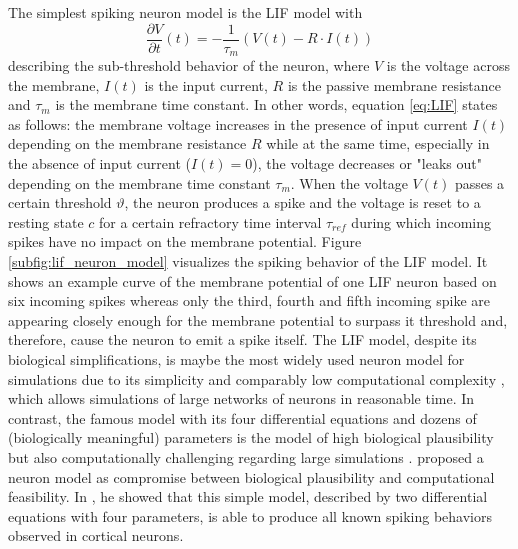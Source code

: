 The simplest spiking neuron model is the \acf{LIF} model with
\begin{equation}
\frac{\partial V}{\partial t}(t) = - \frac{1}{\tau_{m}} \left( V\left(t\right) - R \cdot I\left(t\right) \right)
\label{eq:LIF}
\end{equation}
describing the sub-threshold behavior of the neuron, where $V$ is the voltage across the membrane, $I(t)$ is the input current, $R$ is the passive membrane resistance and $\tau_{m}$ is the membrane time constant.
In other words, equation \ref{eq:LIF} states as follows: the membrane voltage increases in the presence of input current $I(t)$ depending on the membrane resistance $R$ while at the same time, especially in the absence of input current ($I(t)=0$), the voltage decreases or "leaks out" depending on the membrane time constant $\tau_{m}$.
When the voltage $V(t)$ passes a certain threshold $\vartheta$, the neuron produces a spike and the voltage is reset to a resting state $c$ for a certain refractory time interval $\tau_{ref}$ during which incoming spikes have no impact on the membrane potential.
Figure \ref{subfig:lif_neuron_model} visualizes the spiking behavior of the \ac{LIF} model.
It shows an example curve of the membrane potential of one \ac{LIF} neuron based on six incoming spikes whereas only the third, fourth and fifth incoming spike are appearing closely enough for the membrane potential to surpass it threshold and, therefore, cause the neuron to emit a spike itself.
The \ac{LIF} model, despite its biological simplifications, is maybe the most widely used neuron model for simulations due to its simplicity and comparably low computational complexity \parencite{Izhikevich2004}, which allows simulations of large networks of neurons in reasonable time.
In contrast, the famous \textcite{Hodgkin1952} model with its four differential equations and dozens of (biologically meaningful) parameters is the model of high biological plausibility but also computationally challenging regarding large simulations \parencite{Izhikevich2004}.
\textcite{Izhikevich2003} proposed a neuron model  as compromise between biological plausibility and computational feasibility.
In \textcite{Izhikevich2004}, he showed that this simple model, described by two differential equations with four parameters, is able to produce all known spiking behaviors observed in cortical neurons. 

